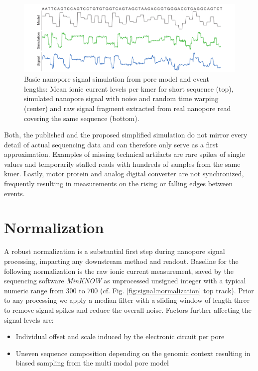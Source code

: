 \begin{figure}[h]
	\centering
	\includegraphics[width=1.0\textwidth]{figures/signal/simulation.pdf}
	\captionsetup{format=plain}
	\caption[Basic signal simulation]{Basic nanopore signal simulation from pore model and event lengths: Mean ionic current levels per kmer for short sequence (top), simulated nanopore signal with noise and random time warping (center) and raw signal fragment extracted from real nanopore read covering the same sequence (bottom).}
	\label{fig:signal:simulation}
\end{figure}

Both, the published and the proposed simplified simulation do not mirror every detail of actual sequencing data and can therefore only serve as a first approximation. Examples of missing technical artifacts are rare spikes of single values and temporarily stalled reads with hundreds of samples from the same kmer. Lastly, motor protein and analog digital converter are not synchronized, frequently resulting in measurements on the rising or falling edges between events.




\section{Normalization}
\label{sec:signal:normalization}

A robust normalization is a substantial first step during nanopore signal processing, impacting any downstream method and readout. Baseline for the following normalization is the raw ionic current measurement, saved by the sequencing software \textit{MinKNOW} as unprocessed unsigned integer with a typical numeric range from 300 to 700 (cf. Fig. \ref{fig:signal:normalization} top track). Prior to any processing we apply a median filter with a sliding window of length three to remove signal spikes and reduce the overall noise. Factors further affecting the signal levels are:

\begin{itemize}
	\item Individual offset and scale induced by the electronic circuit per pore
	\item Uneven sequence composition depending on the genomic context resulting in biased sampling from the multi modal pore model
\end{itemize}

